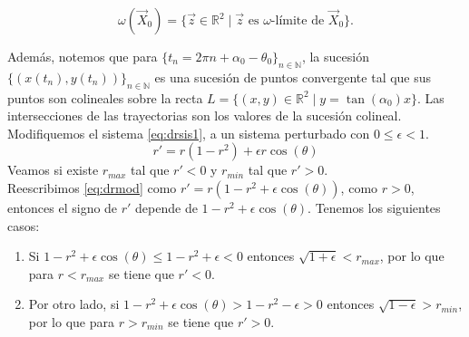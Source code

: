 \documentclass[12pt, a4paper]{report}
\begin{document}
$$\omega(\vec{X}_0)=\{\vec{z}\in\mathbb{R}^2\mid\vec{z} \text{  es  } \omega\text{-límite de  } \vec{X}_0\}.$$


Además, notemos que para $\{t_n=2\pi n+\alpha_0-\theta_0\}_{n\in \mathbb{N}}$,
la sucesión $\{(x(t_n),y(t_n))\}_{n\in\mathbb{N}}$ es una sucesión
de puntos convergente tal que sus puntos son colineales sobre la recta
$L=\{(x,y)\in\mathbb{R}^2\mid y=\tan(\alpha_0)x \}$. Las intersecciones de las trayectorias
son los valores de la sucesión colineal.\\

Modifiquemos el sistema \eqref{eq:drsis1}, a un sistema perturbado
con $0\leq\epsilon<1$.
\begin{equation}\label{eq: drmod}
	r'=r(1-r^2)+\epsilon r\cos(\theta)
\end{equation}
Veamos si existe $r_{max}$ tal que $r'<0$ y $r_{min}$ tal que $r'>0$.\\

Reescribimos \eqref{eq:drmod} como $r'=r(1-r^2+\epsilon \cos(\theta))$, como $r>0$,
entonces el signo de $r'$ depende de $1-r^2+\epsilon \cos(\theta)$.
Tenemos los siguientes casos:

\begin{enumerate}
	\item Si $1-r^2+\epsilon\cos(\theta)\leq 1-r^2+\epsilon<0$
	      entonces $\sqrt{1+\epsilon}<r_{max}$, por lo que para $r<r_{max}$ se tiene que $r'<0$.
	\item Por otro lado, si	$1-r^2+\epsilon\cos(\theta)>1-r^2-\epsilon>0$
	      entonces $\sqrt{1-\epsilon}>r_{min}$, por lo que para $r>r_{min}$ se tiene que $r'>0$.
\end{enumerate}
\end{document}
